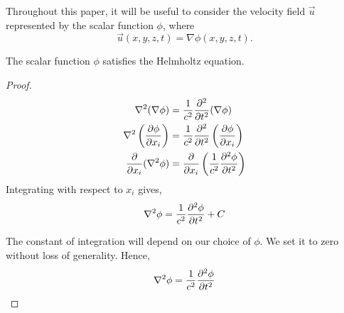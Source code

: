 %
Throughout this paper, it will be useful to consider the velocity field $\vec{u}$ represented by the scalar function $\phi$, where
    \begin{equation}
        \vec{u}(x, y, z, t) = \nabla \phi(x, y, z, t).
    \end{equation}\par
%
    \begin{propn} The scalar function $\phi$ satisfies the Helmholtz equation. 
    \end{propn}
    \begin{proof}
        \begin{align*}
            \nabla^2 (\nabla \phi)
            &= \frac{1}{c^2} \frac{\partial ^2}{\partial t^2} (\nabla \phi) \\
            \nabla^2 \left(\frac{\partial \phi}{\partial x_i}\right)
            &= \frac{1}{c^2} \frac{\partial ^2}{\partial t^2} \left(\frac{\partial \phi}{\partial x_i}\right) \\
            \frac{\partial }{\partial x_i} (\nabla^2 \phi )
            &= \frac{\partial }{\partial x_i} \left(\frac{1}{c^2} \frac{\partial ^2 \phi}{\partial t^2} \right)
        \end{align*}
    Integrating with respect to $x_i$ gives, 
        \begin{equation*}
            \nabla^2 \phi = \frac{1}{c^2} \frac{\partial ^2 \phi}{\partial t^2} + C
        \end{equation*}\par
    The constant of integration will depend on our choice of $\phi$. We set it to zero without loss of generality. Hence,
        \begin{equation}\label{eq:lin_wave_phi}
            \nabla^2 \phi = \frac{1}{c^2} \frac{\partial ^2 \phi}{\partial t^2}
        \end{equation}
    \end{proof}
%
